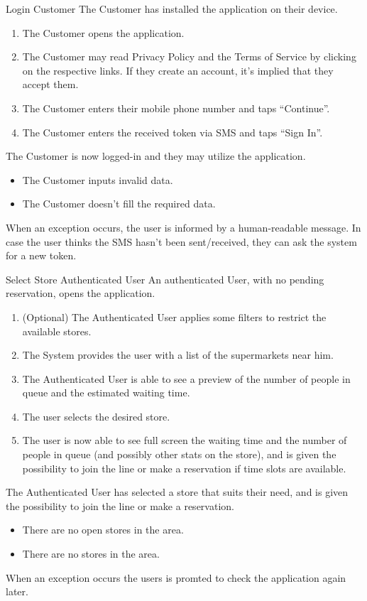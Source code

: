 
\usecase
{Login}
{Customer}
{The Customer has installed the application on their device.}
{
    \begin{enumerate}
        \item The Customer opens the application.
        \item The Customer may read Privacy Policy and the Terms of Service by clicking on the respective links. If they create an account, it's implied that they accept them.
        \item The Customer enters their mobile phone number and taps ``Continue''.
        \item The Customer enters the received token via SMS and taps ``Sign In''.
    \end{enumerate}
}
{The Customer is now logged-in and they may utilize the application.}
{
    \begin{itemize}
        \item The Customer inputs invalid data.
        \item The Customer doesn't fill the required data.
    \end{itemize}
}
{
    When an exception occurs, the user is informed by a human-readable message.
    In case the user thinks the SMS hasn't been sent/received, they can ask the system for a new token.
}

\usecase
{Select Store}
{Authenticated User}
{An authenticated User, with no pending reservation, opens the application.}
{
        \begin{enumerate}
            \item (Optional) The Authenticated User applies some filters to restrict the available stores.  
            \item The System provides the user with a list of the supermarkets near him.
            \item The Authenticated User is able to see a preview of the number of people in queue and the estimated waiting time. 
            \item The user selects the desired store. 
            \item The user is now able to see full screen the waiting time and the number of people in queue (and possibly other stats on the store), and is given the possibility to join the line or make a reservation if time slots are available.  
        \end{enumerate}
}
{
    The Authenticated User has selected a store that suits their need, and is given the possibility to join the line or make a reservation. 
}
{
    \begin{itemize}
        \item There are no open stores in the area. 
        \item There are no stores in the area. 
    \end{itemize}
}
{
    When an exception occurs the users is promted to check the application again later. 
}

